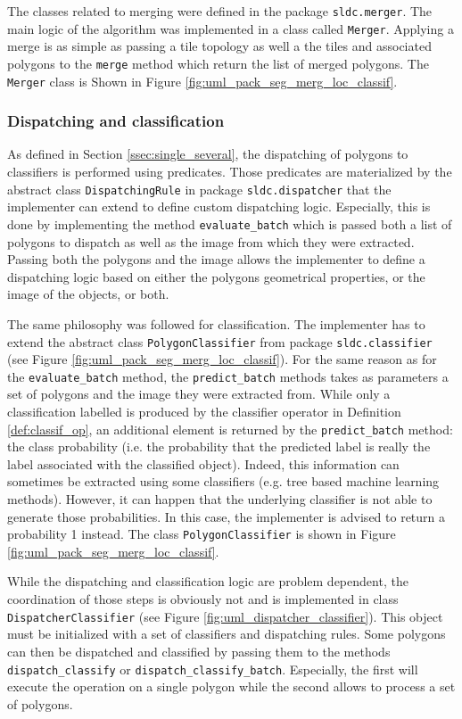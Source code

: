 The classes related to merging were defined in the package \texttt{sldc.merger}. The main logic of the algorithm was implemented in a class called \texttt{Merger}. Applying a merge is as simple as passing a tile topology as well a the tiles and associated polygons to the \texttt{merge} method which return the list of merged polygons. The \texttt{Merger} class is Shown in Figure \ref{fig:uml_pack_seg_merg_loc_classif}.

\subsubsection{Dispatching and classification}
\label{sssec:dispatch}
As defined in Section \ref{ssec:single_several}, the dispatching of polygons to classifiers is performed using predicates. Those predicates are materialized by the abstract class \texttt{DispatchingRule} in package \texttt{sldc.dispatcher} that the implementer can extend to define custom dispatching logic. Especially, this is done by implementing the method \texttt{evaluate\_batch} which is passed both a list of polygons to dispatch as well as the image from which they were extracted. Passing both the polygons and the image allows the implementer to define a dispatching logic based on either the polygons geometrical properties, or the image of the objects, or both.  

The same philosophy was followed for classification. The implementer has to extend the abstract class \texttt{PolygonClassifier} from package \texttt{sldc.classifier} (see Figure \ref{fig:uml_pack_seg_merg_loc_classif}). For the same reason as for the \texttt{evaluate\_batch} method, the \texttt{predict\_batch} methods takes as parameters a set of polygons and the image they were extracted from. While only a classification labelled is produced by the classifier operator in Definition \ref{def:classif_op}, an additional element is returned by the \texttt{predict\_batch} method: the class probability (i.e. the probability that the predicted label is really the label associated with the classified object). Indeed, this information can sometimes be extracted using some classifiers (e.g. tree based machine learning methods). However, it can happen that the underlying classifier is not able to generate those probabilities. In this case, the implementer is advised to return a probability 1 instead. The class \texttt{PolygonClassifier} is shown in Figure \ref{fig:uml_pack_seg_merg_loc_classif}.

While the dispatching and classification logic are problem dependent, the coordination of those steps is obviously not and is implemented in class \texttt{DispatcherClassifier} (see Figure \ref{fig:uml_dispatcher_classifier}). This object must be initialized with a set of classifiers and dispatching rules. Some polygons can then be dispatched and classified by passing them to the methods \texttt{dispatch\_classify} or \texttt{dispatch\_classify\_batch}. Especially, the first will execute the operation on a single polygon while the second allows to process a set of polygons. 

